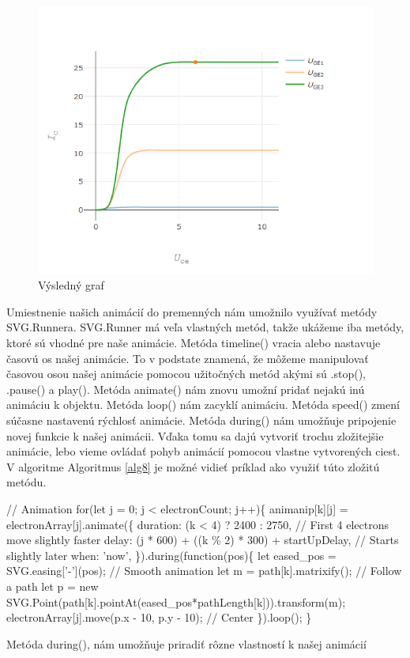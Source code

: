 \begin{figure}[!htbp]
    \centering
    \includegraphics[width=12cm]{img/graf.PNG}
    \caption{Výsledný graf}
    \label{graf}
\end{figure}

Umiestnenie našich animácií do premenných nám umožnilo využívať metódy SVG.Runnera. SVG.Runner má veľa vlastných metód, takže ukážeme iba metódy, ktoré sú vhodné pre  naše animácie. Metóda timeline() vracia alebo nastavuje časovú os našej animácie. To v podstate znamená, že môžeme manipulovať časovou osou našej animácie pomocou užitočných metód akými sú .stop(), .pause() a play(). Metóda animate() nám znovu umožní pridať nejakú inú animáciu k objektu. Metóda loop() nám zacyklí animáciu. Metóda speed() zmení súčasne nastavenú rýchlosť animácie. Metóda during() nám umožňuje pripojenie novej funkcie k našej animácii. Vďaka tomu sa dajú vytvoriť trochu zložitejšie animácie, lebo vieme ovládať pohyb animácií pomocou vlastne vytvorených ciest. V algoritme Algoritmus \ref{alg8} je možné vidieť príklad ako využiť túto zložitú metódu.

\begin{algorithm}
\begin{algorithmic}
\STATE     // Animation
\STATE    for(let j = 0; j < electronCount; j++)\{
\STATE \tab     animanip[k][j] = electronArray[j].animate(\{
\STATE \tab \tab       duration: (k < 4) ? 2400 : 2750,                        // First 4 electrons move slightly faster  
\STATE \tab \tab      delay: (j * 600) + ((k \% 2) * 300) + startUpDelay,      // Starts slightly later
\STATE  \tab \tab      when: 'now',
\STATE \tab     \}).during(function(pos)\{
\STATE  \tab \tab      let eased\_pos = SVG.easing['-'](pos);                   // Smooth animation
\STATE  \tab \tab      let m = path[k].matrixify();                            // Follow a path
\STATE \tab \tab       let p = new SVG.Point(path[k].pointAt(eased\_pos*pathLength[k])).transform(m);
\STATE  \tab \tab      electronArray[j].move(p.x - 10, p.y - 10);              // Center 
\STATE  \tab    \}).loop();
\STATE    \}
\caption{Metóda during(), nám umožňuje priradiť rôzne vlastností k našej animácií}
\label{alg8} 
\end{algorithmic}
\end{algorithm}

